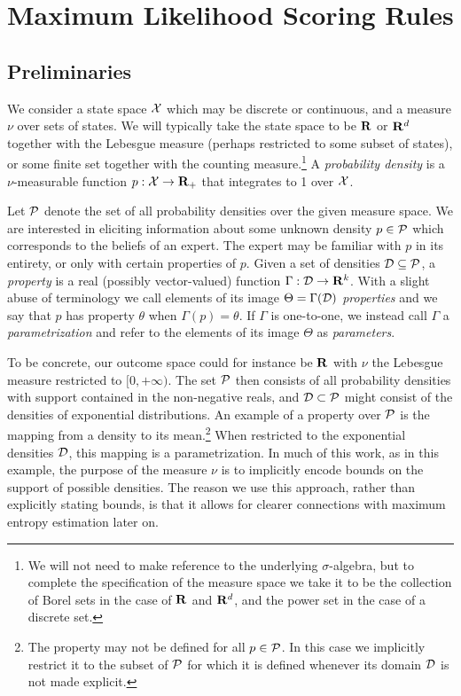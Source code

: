 \section{Maximum Likelihood Scoring Rules}


\subsection{Preliminaries}

We consider a state space $\mathcal{X}$ which may be discrete or continuous, and a measure $\nu$ over sets of states. We will typically take the state space to be  $\mathbf{R}$ or $\mathbf{R}^d$ together with the Lebesgue measure (perhaps restricted to some subset of states), or some finite set together with the counting measure.\footnote{We will not need to make reference to the underlying $\sigma$-algebra, but to complete the specification of the measure space we take it to be the collection of Borel sets in the case of $\mathbf{R}$ and $\mathbf{R}^d$, and the power set in the case of a discrete set.} A \emph{probability density} is a $\nu$-measurable function $p : \mathcal{X} \rightarrow \mathbf{R}_+$ that integrates to 1 over $\mathcal{X}$. 

Let $\mathcal{P}$ denote the set of all probability densities over the given measure space. We are interested in eliciting information about some unknown density $p \in \mathcal{P}$ which corresponds to the beliefs of an expert. The expert may be familiar with $p$ in its entirety, or only with certain properties of $p$.  Given a set of densities $\mathcal{D} \subseteq \mathcal{P}$, a \emph{property}  is a real (possibly vector-valued) function $\Gamma : \mathcal{D} \rightarrow \mathbf{R}^k$. With a slight abuse of terminology we call elements of its image $\Theta = \Gamma(\mathcal{D})$ \emph{properties} and we say that $p$ has property $\theta$ when $\Gamma(p) = \theta$. If $\Gamma$ is one-to-one, we instead call $\Gamma$ a \emph{parametrization} and refer to the elements of its image $\Theta$ as \emph{parameters}. 

To be concrete, our outcome space could for instance be $\mathbf{R}$ with $\nu$ the Lebesgue measure restricted to $[0,+\infty)$. The set $\mathcal{P}$ then consists of all probability densities with support contained in the non-negative reals, and $\mathcal{D} \subset \mathcal{P}$ might consist of the densities of exponential distributions. An example of a property over $\mathcal{P}$ is the mapping from a density to its mean.\footnote{The property may not be defined for all $p \in \mathcal{P}$. In this case we implicitly restrict it to the subset of $\mathcal{P}$ for which it is defined whenever its domain $\mathcal{D}$ is not made explicit.} When restricted to the exponential densities $\mathcal{D}$, this mapping is a parametrization. In much of this work, as in this example, the purpose of the measure $\nu$ is to implicitly encode bounds on the support of possible densities. The reason we use this approach, rather than explicitly stating bounds, is that it allows for clearer connections with maximum entropy estimation later on.

